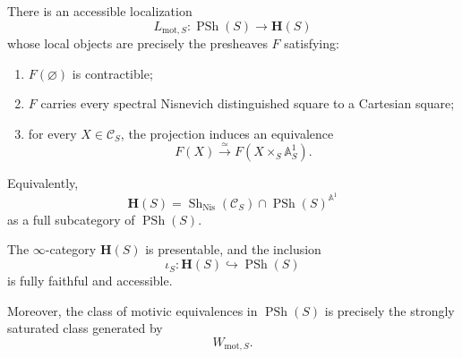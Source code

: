 \begin{theorem}
\label{thm:brave-new-motivic-localization}
There is an accessible localization
\[
    L_{\mathrm{mot},S}
    \colon
    \operatorname{PSh}(S)
    \longrightarrow
    \mathbf H(S)
\]
whose local objects are precisely the presheaves \(F\) satisfying:
\begin{enumerate}[label=(\roman*)]
    \item \(F(\varnothing)\) is contractible;

    \item \(F\) carries every spectral Nisnevich distinguished square to
    a Cartesian square;

    \item for every \(X\in\mathcal C_S\), the projection induces an
    equivalence
    \[
        F(X)
        \xrightarrow{\simeq}
        F(X\times_S\mathbb A^1_S).
    \]
\end{enumerate}
Equivalently,
\[
    \mathbf H(S)
    =
    \operatorname{Sh}_{\mathrm{Nis}}(\mathcal C_S)
    \cap
    \operatorname{PSh}(S)^{\mathbb A^1}
\]
as a full subcategory of \(\operatorname{PSh}(S)\).

The \(\infty\)-category \(\mathbf H(S)\) is presentable, and the
inclusion
\[
    \iota_S
    \colon
    \mathbf H(S)
    \hookrightarrow
    \operatorname{PSh}(S)
\]
is fully faithful and accessible.

Moreover, the class of motivic equivalences in
\(\operatorname{PSh}(S)\) is precisely the strongly saturated class
generated by
\[
    W_{\mathrm{mot},S}.
\]
\end{theorem}


